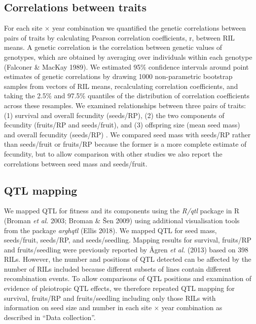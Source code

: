 \documentclass[]{article}
\begin{document}
\hypertarget{correlations-between-traits}{%
\subsection{Correlations between traits}\label{correlations-between-traits}}

For each site × year combination we quantified the genetic correlations between pairs of traits by calculating Pearson correlation coefficients, r, between RIL means. A genetic correlation is the correlation between genetic values of genotypes, which are obtained by averaging over individuals within each genotype (Falconer \& MacKay 1989). We estimated 95\% confidence intervals around point estimates of genetic correlations by drawing 1000 non-parametric bootstrap samples from vectors of RIL means, recalculating correlation coefficients, and taking the 2.5\% and 97.5\% quantiles of the distribution of correlation coefficients across these resamples. We examined relationships between three pairs of traits: (1) survival and overall fecundity (seeds/RP), (2) the two components of fecundity (fruits/RP and seeds/fruit), and (3) offspring size (mean seed mass) and overall fecundity (seeds/RP) . We compared seed mass with seeds/RP rather than seeds/fruit or fruits/RP because the former is a more complete estimate of fecundity, but to allow comparison with other studies we also report the correlations between seed mass and seeds/fruit.

\hypertarget{qtl-mapping}{%
\subsection{QTL mapping}\label{qtl-mapping}}

We mapped QTL for fitness and its components using the \emph{R/qtl} package in R (Broman \emph{et al.} 2003; Broman \& Šen 2009) using additional visualisation tools from the package \emph{arghqtl} (Ellis 2018). We mapped QTL for seed mass, seeds/fruit, seeds/RP, and seeds/seedling. Mapping results for survival, fruits/RP and fruits/seedling were previously reported by Ågren \emph{et al.} (2013) based on 398 RILs. However, the number and positions of QTL detected can be affected by the number of RILs included because different subsets of lines contain different recombination events. To allow comparisons of QTL positions and examination of evidence of pleiotropic QTL effects, we therefore repeated QTL mapping for survival, fruits/RP and fruits/seedling including only those RILs with information on seed size and number in each site × year combination as described in ``Data collection''.
\end{document}
